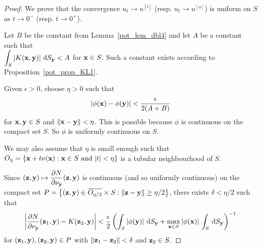 \begin{proof}
We prove that the convergence $u_t \rightarrow u^{[i]}$ (resp.
$u_t \rightarrow u^{[o]}$) is uniform on $S$ as
$t\rightarrow 0^-$ (resp. $t\rightarrow 0^+$).

Let $B$ be the constant from Lemma~\ref{pot_lem_dbl4} and let $A$
be a constant such that \\
$\displaystyle \int_S \left| K(\mathbf{x},\mathbf{y}) \right|
\,\mathrm{d}{S}_{\mathbf{y}} < A$ for $\mathbf{x} \in S$.  Such a constant exists according
to Proposition~\ref{pot_prop_KL1}.

Given $\epsilon >0$, choose $\eta>0$ such that
\begin{equation} \label{pot_dblp_B2}
\left|\phi(\mathbf{x}) - \phi(\mathbf{y}) \right| < \frac{\epsilon}{2(A + B)}
\end{equation}
for $\mathbf{x}, \mathbf{y} \in S$ and $\|\mathbf{x} - \mathbf{y}\| < \eta$.
This is possible because $\phi$ is continuous on the compact
set $S$.  So $\phi$ is uniformly continuous on
$S$.

We may also assume that $\eta$ is small enough such that
$\displaystyle
O_\eta = \left\{ \mathbf{x} + t \mathbf{\nu}(\mathbf{x}) : \mathbf{x} \in S
\ \text{and} \ |t| < \eta \right\}$
is a tubular neighbourhood of $S$.

Since
$\displaystyle
(\mathbf{z},\mathbf{y}) \mapsto \frac{\partial{N}}{\partial \mathbf{\nu}_{\mathbf{y}}}(\mathbf{z},\mathbf{y})$ is
continuous (and so uniformly continuous) on the compact set
$\displaystyle
P = \left\{ (\mathbf{z},\mathbf{y}) \in \overline{O_{\eta/2}} \times S
: \| \mathbf{z}-\mathbf{y} \| \geq \eta/2 \right\}$,
there exists $\delta < \eta/2$ such that
\begin{equation} \label{pot_dblp_B1}
\left| \frac{\partial{N}}{\partial \mathbf{\nu}_{\mathbf{y}}}(\mathbf{z}_1,\mathbf{y})
 - K(\mathbf{z}_2,\mathbf{y})
\right| < \frac{\epsilon}{2} \left(\int_S
\left| \phi(\mathbf{y}) \right| \,\mathrm{d}{S}_{\mathbf{y}} + \max_{\mathbf{x}\in S}
|\phi(\mathbf{x})|\, \int_S \,\mathrm{d}{S}_{\mathbf{y}} \right)^{-1}
\end{equation}
for $(\mathbf{z}_1,\mathbf{y}) , (\mathbf{z}_2,\mathbf{y}) \in P$ with
$\|\mathbf{z}_1-\mathbf{z}_2\| < \delta$ and $\mathbf{z}_2 \in S$.


\end{proof}
